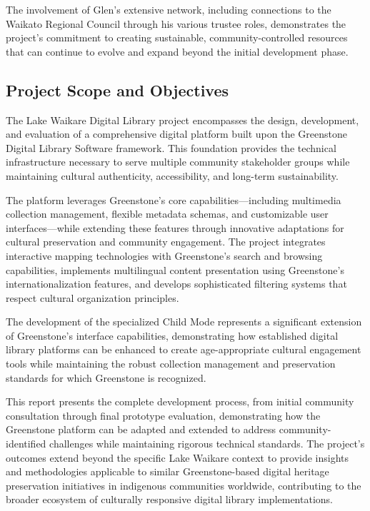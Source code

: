 The involvement of Glen's extensive network, including connections to the Waikato Regional Council through his various trustee roles, demonstrates the project's commitment to creating sustainable, community-controlled resources that can continue to evolve and expand beyond the initial development phase.

\subsection{Project Scope and Objectives}

The Lake Waikare Digital Library project encompasses the design, development, and evaluation of a comprehensive digital platform built upon the Greenstone Digital Library Software framework. This foundation provides the technical infrastructure necessary to serve multiple community stakeholder groups while maintaining cultural authenticity, accessibility, and long-term sustainability.

The platform leverages Greenstone's core capabilities—including multimedia collection management, flexible metadata schemas, and customizable user interfaces—while extending these features through innovative adaptations for cultural preservation and community engagement. The project integrates interactive mapping technologies with Greenstone's search and browsing capabilities, implements multilingual content presentation using Greenstone's internationalization features, and develops sophisticated filtering systems that respect cultural organization principles.

The development of the specialized Child Mode represents a significant extension of Greenstone's interface capabilities, demonstrating how established digital library platforms can be enhanced to create age-appropriate cultural engagement tools while maintaining the robust collection management and preservation standards for which Greenstone is recognized.

This report presents the complete development process, from initial community consultation through final prototype evaluation, demonstrating how the Greenstone platform can be adapted and extended to address community-identified challenges while maintaining rigorous technical standards. The project's outcomes extend beyond the specific Lake Waikare context to provide insights and methodologies applicable to similar Greenstone-based digital heritage preservation initiatives in indigenous communities worldwide, contributing to the broader ecosystem of culturally responsive digital library implementations.